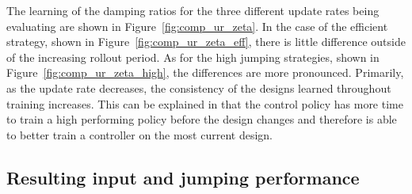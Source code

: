 The learning of the damping ratios for the three different update rates being evaluating are shown in Figure~\ref{fig:comp_ur_zeta}. In the case of the efficient strategy, shown in Figure~\ref{fig:comp_ur_zeta_eff}, there is little difference outside of the increasing rollout period. As for the high jumping strategies, shown in Figure~\ref{fig:comp_ur_zeta_high}, the differences are more pronounced. Primarily, as the update rate decreases, the consistency of the designs learned throughout training increases. This can be explained in that the control policy has more time to train a high performing policy before the design changes and therefore is able to better train a controller on the most current design. 

\subsection{Resulting input and jumping performance}
%  
